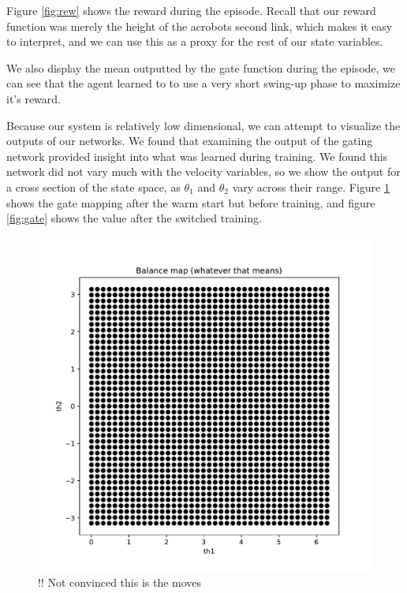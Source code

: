 \documentclass[letterpaper, 10 pt, conference]{ieeeconf}
\begin{document}
Figure \ref{fig:rew} shows the reward during the episode. Recall that our reward function was merely the height of the acrobots second link, which makes it easy to interpret, and we can use this as a proxy for the rest of our state variables.   


We also display the mean outputted by the gate function during the episode, we can see that the agent learned to to use a very short swing-up phase to maximize it's reward. 

Because our system is relatively low dimensional, we can attempt to visualize the outputs of our networks. We found that examining the output of the gating network provided insight into what was learned during training. We found this network did not vary much with the velocity variables, so we show the output for a cross section of the state space, as $\theta_{1}$ and $\theta_{2}$ vary across their range. Figure \ref{fig:gate_pre} shows the gate mapping after the warm start but before training, and figure \ref{fig:gate} shows the value after the switched training. 

\begin{figure}[h]
\centering
  \includegraphics[scale=.4]{th_map.pdf}
  \caption{!! Not convinced this is the moves}
  \label{fig:gate_pre}
\end{figure}
\end{document}
